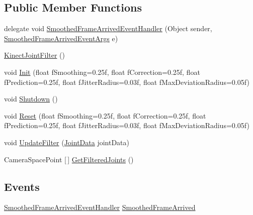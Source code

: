 \subsection*{Public Member Functions}
\begin{DoxyCompactItemize}
\item 
delegate void \hyperlink{class_rowing_monitor_1_1_model_1_1_pipeline_1_1_kinect_joint_filter_ac3f380b74d953666c314d93452c3e1f5}{Smoothed\+Frame\+Arrived\+Event\+Handler} (Object sender, \hyperlink{class_rowing_monitor_1_1_model_1_1_smoothed_frame_arrived_event_args}{Smoothed\+Frame\+Arrived\+Event\+Args} e)
\item 
\hyperlink{class_rowing_monitor_1_1_model_1_1_pipeline_1_1_kinect_joint_filter_a9da91926de15721cdc7631b6c9966ab7}{Kinect\+Joint\+Filter} ()
\item 
void \hyperlink{class_rowing_monitor_1_1_model_1_1_pipeline_1_1_kinect_joint_filter_ad057ad56f551f53d46e8b3b8ce11f1aa}{Init} (float f\+Smoothing=0.\+25f, float f\+Correction=0.\+25f, float f\+Prediction=0.\+25f, float f\+Jitter\+Radius=0.\+03f, float f\+Max\+Deviation\+Radius=0.\+05f)
\item 
void \hyperlink{class_rowing_monitor_1_1_model_1_1_pipeline_1_1_kinect_joint_filter_a7fa54bbd5a70ae429a3faac8e732daf1}{Shutdown} ()
\item 
void \hyperlink{class_rowing_monitor_1_1_model_1_1_pipeline_1_1_kinect_joint_filter_a1ae0e8f5936e1c6a4294a0db5e360996}{Reset} (float f\+Smoothing=0.\+25f, float f\+Correction=0.\+25f, float f\+Prediction=0.\+25f, float f\+Jitter\+Radius=0.\+03f, float f\+Max\+Deviation\+Radius=0.\+05f)
\item 
void \hyperlink{class_rowing_monitor_1_1_model_1_1_pipeline_1_1_kinect_joint_filter_a93d08940ef6304498c4ff9ad6262c266}{Update\+Filter} (\hyperlink{struct_rowing_monitor_1_1_model_1_1_util_1_1_joint_data}{Joint\+Data} joint\+Data)
\item 
Camera\+Space\+Point \mbox{[}$\,$\mbox{]} \hyperlink{class_rowing_monitor_1_1_model_1_1_pipeline_1_1_kinect_joint_filter_afacadd63a8975388f5b40346c6a7579e}{Get\+Filtered\+Joints} ()
\end{DoxyCompactItemize}
\subsection*{Events}
\begin{DoxyCompactItemize}
\item 
\hyperlink{class_rowing_monitor_1_1_model_1_1_pipeline_1_1_kinect_joint_filter_ac3f380b74d953666c314d93452c3e1f5}{Smoothed\+Frame\+Arrived\+Event\+Handler} \hyperlink{class_rowing_monitor_1_1_model_1_1_pipeline_1_1_kinect_joint_filter_a277ea9127efcee74bd306b85103034f7}{Smoothed\+Frame\+Arrived}
\end{DoxyCompactItemize}


